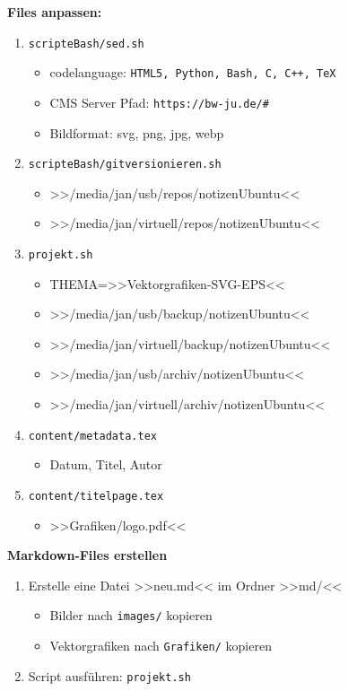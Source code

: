\textbf{Files anpassen:}

\begin{enumerate}
\item
  \verb|scripteBash/sed.sh|

  \begin{itemize}
  \item
    codelanguage:
    \verb|HTML5, Python, Bash, C, C++, TeX|
  \item
    CMS Server Pfad: \verb|https://bw-ju.de/#|
  \item
    Bildformat: svg, png, jpg, webp
  \end{itemize}
\item
  \verb|scripteBash/gitversionieren.sh|

  \begin{itemize}
  \item
    >>/media/jan/usb/repos/notizenUbuntu<<
  \item
    >>/media/jan/virtuell/repos/notizenUbuntu<<
  \end{itemize}
\item
  \verb|projekt.sh|

  \begin{itemize}
  \item
    THEMA=>>Vektorgrafiken-SVG-EPS<<
  \item
    >>/media/jan/usb/backup/notizenUbuntu<<
  \item
    >>/media/jan/virtuell/backup/notizenUbuntu<<
  \item
    >>/media/jan/usb/archiv/notizenUbuntu<<
  \item
    >>/media/jan/virtuell/archiv/notizenUbuntu<<
  \end{itemize}
\item
  \verb|content/metadata.tex|

  \begin{itemize}
  \item
    Datum, Titel, Autor
  \end{itemize}
\item
  \verb|content/titelpage.tex|

  \begin{itemize}
  \item
    >>Grafiken/logo.pdf<<
  \end{itemize}
\end{enumerate}

\textbf{Markdown-Files erstellen}

\begin{enumerate}
\item
  Erstelle eine Datei >>neu.md<< im Ordner >>md/<<

  \begin{itemize}
  \item
    Bilder nach \verb|images/| kopieren
  \item
    Vektorgrafiken nach \verb|Grafiken/| kopieren
  \end{itemize}
\item
  Script ausführen: \verb|projekt.sh|
\end{enumerate}

